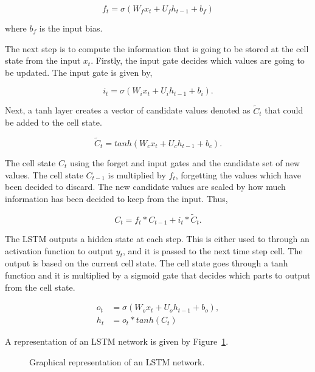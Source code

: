 \begin{equation}\label{eq:forget_gate}
    f_{t} = \sigma(W_{f}x_{t} + U_{f}h_{t-1} + b_{f})
\end{equation}

where \(b_{f}\) is the input bias.

The next step is to compute the information that is going to be stored at the
cell state from the input \(x_t\). Firstly, the input gate decides which values
are going to be updated. The input gate is given by,

\begin{equation}\label{eq:input_gate}
    i_{t} = \sigma(W_{i}x_{t} + U_{i}h_{t-1} + b_{i}).
\end{equation}

Next, a tanh layer creates a vector of candidate values denoted as \(\tilde{C}_{t}\)
that could be added to the cell state.

\begin{equation}\label{eq:input_gate}
    \tilde{C}_{t} = tanh(W_{c}x_{t} + U_{c}h_{t-1} + b_{c}).
\end{equation}

The cell state \(C_{t}\) using the forget and input gates and the candidate
set of new values. The cell state \(C_{t-1}\) is multiplied by \(f_{t}\), forgetting
the values which have been decided to discard. The new candidate values are
scaled by how much information has been decided to keep from the input. Thus,

\begin{equation}\label{eq:input_gate}
    C_{t} = f_{t} * C_{t-1} + i_{t} * \tilde{C}_{t}.
\end{equation}

The LSTM outputs a hidden state at each step. This is either used to through
an activation function to output \(y_{t}\), and it is passed to the next time
step cell. The output is based on the current cell state. The cell state goes
through a tanh function and it is multiplied by a sigmoid gate that decides which
parts to output from the cell state.

\begin{align}\label{eq:input_gate}
    o_{t} & = \sigma(W_{o}x_{t} + U_{o}h_{t-1} + b_{o}), \\
    h_{t} & = o_{t} * tanh(C_{t})
\end{align}

A representation of an LSTM network is given by Figure~\ref{fig:lstm}.

\begin{figure}[!htbp]
    \centering
    
    \caption{Graphical representation of an LSTM network.}\label{fig:lstm}
\end{figure}

